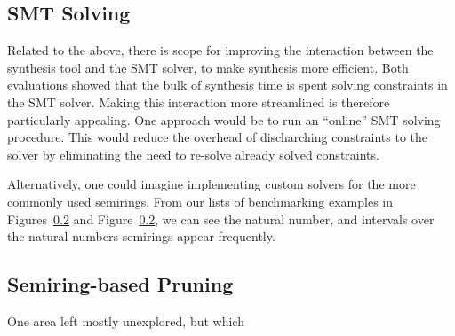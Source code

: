 \subsection{SMT Solving}
Related to the above, there is scope for improving the interaction between the
synthesis tool and the SMT solver, to make synthesis more efficient. Both
evaluations showed that the bulk of synthesis time is spent solving constraints
in the SMT solver. Making this interaction more streamlined is therefore
particularly appealing. One approach would be to run an ``online'' SMT solving
procedure. This would reduce the overhead of discharching constraints to the
solver by eliminating the need to re-solve already solved constraints. 

Alternatively, one could imagine implementing custom solvers for the more
commonly used semirings. From our lists of benchmarking examples in
Figures~\ref{} and Figure~\ref{}, we can see the natural number, and intervals
over the natural numbers semirings appear frequently. 

\subsection{Semiring-based Pruning}
One area left mostly unexplored, but which 


